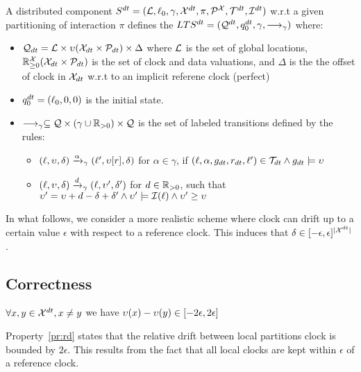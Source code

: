 \begin{property}[Semantics]
  A distributed component $S^{dt}=(\mathcal{L},\ell_0,\gamma,\mathcal{X}^{dt},\pi,\mathcal{P}^{\mathcal{X}},\mathcal{T}^{dt},\mathcal{I}^{dt})$
  w.r.t a given partitioning of interaction $\pi$ defines the $LTS^{dt}=(\mathcal{Q}^{dt},q_0^{dt},\gamma,\longrightarrow_{\gamma})$ where:
  \begin{itemize}
    \item $\mathcal{Q}_{dt}=\mathcal{L}\times\upsilon(\mathcal{X}_{dt}\times\mathcal{P}_{dt})\times\Delta$ where $\mathcal{L}$ is the set of global 
      locations, $\mathbb{R}_{\ge 0}^{\mathcal{X}}(\mathcal{X}_{dt}\times\mathcal{P}_{dt})$ is the set of clock and data valuations, and $\Delta$ is the
      the offset of clock in $\mathcal{X}_{dt}$ w.r.t to an implicit referene clock (perfect)
    \item $q_0^{dt}=(\ell_0,0,0)$ is the initial state.
    \item $\longrightarrow_{\gamma}\subseteq\mathcal{Q}\times(\gamma\cup\mathbb{R}_{> 0})\times\mathcal{Q}$ is the set of labeled transitions defined by the rules:
    \begin{itemize}
      \item $(\ell,\upsilon,\delta)\xrightarrow{\alpha}_{\gamma}(\ell',\upsilon[r],\delta)$ for $\alpha\in\gamma$, if
      $(\ell,\alpha,g_{dt},r_{dt},\ell')\in\mathcal{T}_{dt}\wedge g_{dt}\models\upsilon$
    \item $(\ell,\upsilon,\delta)\xrightarrow{d}_{\gamma}(\ell,\upsilon',\delta')$ for $d\in\mathbb{R}_{> 0}$, 
      such that $\upsilon'=\upsilon+d-\delta+\delta'\wedge \upsilon'\models\mathcal{I}(\ell)\wedge\upsilon'\ge\upsilon$
    \end{itemize}
  \end{itemize}
\end{property}

In what follows, we consider a more realistic scheme where clock can drift up
to a certain value $\epsilon$ with respect to a reference clock.
This induces that $\delta\in[-\epsilon,\epsilon]^{|\mathcal{X}^{dt}|}$.


\subsection{Correctness}

\begin{property}\label{pr:rd}
  $\forall x,y\in\mathcal{X}^{dt},x\neq y$ we have $\upsilon(x)-\upsilon(y)\in[-2\epsilon,2\epsilon]$
\end{property}

Property~\ref{pr:rd} states that the relative drift between local partitions 
clock is bounded by $2\epsilon$. This results from the fact that all local
clocks are kept within $\epsilon$ of a reference clock.

